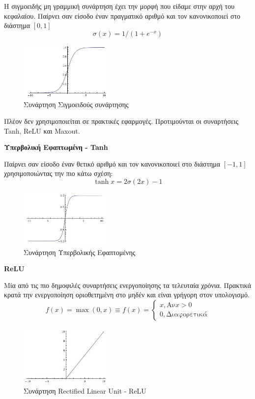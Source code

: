 Η σιγμοειδής μη γραμμική συνάρτηση έχει την μορφή που είδαμε στην αρχή του κεφαλαίου.
Παίρνει σαν είσοδο έναν πραγματικό αριθμό και τον κανονικοποιεί στο διάστημα $[0, 1]$
\[
  \sigma(x) = 1 / (1 + e^{-x})
\]

\begin{figure}[!ht]
  \centering
  \includegraphics[width=0.4\textwidth]{./images/chapter3/sigmoid.jpg}
  \caption[Συνάρτηση Σιγμοειδούς συνάρτησης]{Συνάρτηση Σιγμοειδούς συνάρτησης}
  \label{fig:sigmoid}
\end{figure}

Πλέον δεν χρησιμοποιείται σε πρακτικές εφαρμογές. Προτιμούνται οι συναρτήσεις
Tanh, ReLU και Maxout.

\textbf{Υπερβολική Εφαπτωμένη - Tanh}

Παίρνει σαν είσοδο έναν θετικό αριθμό και τον κανονικοποιεί στο διάστημα $[-1, 1]$
χρησιμοποιώντας την πιο κάτω σχέση:
\[
  \tanh{x} = 2\sigma(2x) - 1
\]

\begin{figure}[!ht]
  \centering
  \includegraphics[width=0.4\textwidth]{./images/chapter3/tanh.jpg}
  \caption[Συνάρτηση Υπερβολικής Εφαπτωμένης]{Συνάρτηση Υπερβολικής Εφαπτομένης}
  \label{fig:tanh}
\end{figure}

\textbf{ReLU}

Μία από τις πιο δημοφιλές συναρτήσεις ενεργοποίησης τα τελευταία χρόνια.
Πρακτικά κρατά την ενεργοποίηση οριοθετημένη στο μηδέν και είναι
γρήγορη στον υπολογισμό.
\[
  f(x) = \max(0, x) \equiv f(x) =
  \begin{cases}
    x, \text{Αν} x > 0 \\
    0, \text{Διαφορετικά}
  \end{cases}
\]

\begin{figure}[!ht]
  \centering
  \includegraphics[width=0.4\textwidth]{./images/chapter3/relu.jpg}
  \caption[Συνάρτηση Rectified Linear Unit - ReLU]{Συνάρτηση Rectified Linear Unit - ReLU}
  \label{fig:tanh}
\end{figure}

